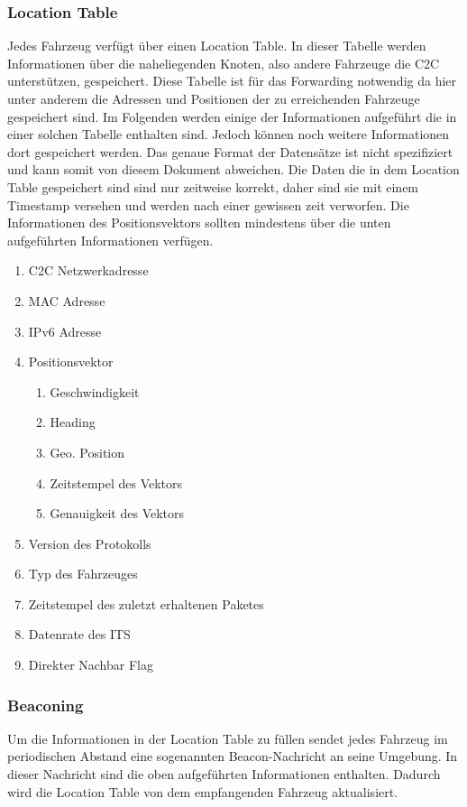\subsubsection{Location Table}
Jedes Fahrzeug verfügt über einen Location Table. In dieser Tabelle werden Informationen über die naheliegenden Knoten, also andere Fahrzeuge die C2C unterstützen, gespeichert. Diese Tabelle ist für das Forwarding notwendig da hier unter anderem die Adressen und Positionen der zu erreichenden Fahrzeuge gespeichert sind. 
Im Folgenden werden einige der Informationen aufgeführt die in einer solchen Tabelle enthalten sind. Jedoch können noch weitere Informationen dort gespeichert werden. Das genaue Format der Datensätze ist nicht spezifiziert und kann somit von diesem Dokument abweichen. Die Daten die in dem Location Table gespeichert sind sind nur zeitweise korrekt, daher sind sie mit einem Timestamp versehen und werden nach einer gewissen zeit verworfen. Die Informationen des Positionsvektors sollten mindestens über die unten aufgeführten Informationen verfügen. 
\begin{enumerate}
      \item C2C Netzwerkadresse
      \item MAC Adresse
      \item IPv6 Adresse
      \item Positionsvektor
      \begin{enumerate}
      	\item Geschwindigkeit
	\item Heading
	\item Geo. Position
	\item Zeitstempel des Vektors
	\item Genauigkeit des Vektors
      \end{enumerate}
      \item Version des Protokolls
      \item Typ des Fahrzeuges
      \item Zeitstempel des zuletzt erhaltenen Paketes
      \item Datenrate des ITS
      \item Direkter Nachbar Flag
\end{enumerate}

\subsubsection{Beaconing}
Um die Informationen in der Location Table zu füllen sendet jedes Fahrzeug im periodischen Abstand eine sogenannten Beacon-Nachricht an seine Umgebung. In dieser Nachricht sind die oben aufgeführten Informationen enthalten. Dadurch wird die Location Table von dem empfangenden Fahrzeug aktualisiert.

